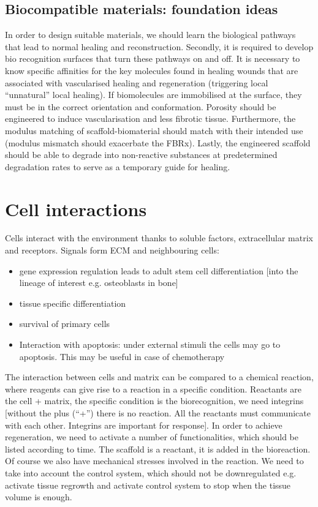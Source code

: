 \subsection{Biocompatible materials: foundation ideas}
In order to design suitable materials, we should learn the biological pathways that lead to normal healing and reconstruction. Secondly, it is required to develop bio recognition surfaces that turn these pathways on and off. It is necessary to know specific affinities for the key molecules found in healing wounds that are associated with vascularised healing and regeneration (triggering local “unnatural” local healing).
If biomolecules are immobilised at the surface, they must be in the correct orientation and conformation. Porosity should be engineered to induce vascularisation and less fibrotic tissue. Furthermore, the modulus matching of scaffold-biomaterial should match with their intended use (modulus mismatch should exacerbate the FBRx).
Lastly, the engineered scaffold should be able to degrade into non-reactive substances at predetermined degradation rates to serve as a temporary guide for healing.

\section{Cell interactions}
Cells interact with the environment thanks to soluble factors, extracellular matrix and receptors.
Signals form ECM and neighbouring cells:
\begin{itemize}
\item gene expression regulation leads to adult stem cell differentiation [into the lineage of interest e.g. osteoblasts in bone]
\item tissue specific differentiation
\item survival of primary cells
\item Interaction with apoptosis: under external stimuli the cells may go to apoptosis. This may be useful in case of chemotherapy
\end{itemize}
The interaction between cells and matrix can be compared to a chemical reaction, where reagents can give rise to a reaction in a specific condition. Reactants are the cell + matrix, the specific condition is the biorecognition, we need integrins [without the plus (“+”) there is no reaction. All the reactants must communicate with each other. Integrins are important for response].
In order to achieve regeneration, we need to activate a number of functionalities, which should be listed according to time. The scaffold is a reactant, it is added in the bioreaction. Of course we also have mechanical stresses involved in the reaction. We need to take into account the control system, which should not be downregulated e.g. activate tissue regrowth and activate control system to stop when the tissue volume is enough.

